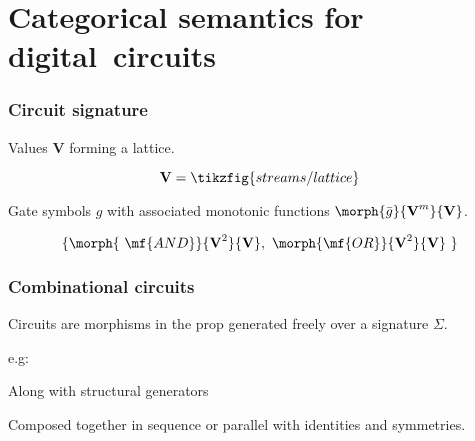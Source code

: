 \section{Categorical semantics for digital~circuits}

\begin{frame}
    \frametitle{Circuit signature}

    \pause

    \alert{Values} $\textbf{V}$ forming a lattice.

    \pause

    \[\textbf{V} = \tikzfig{streams/lattice}\]

    \pause

    \alert{Gate symbols} $g$ with associated monotonic functions $\morph{\bar{g}}{\textbf{V}^m}{\textbf{V}}$.

    \pause

    \[\{\morph{\ \mf{AND}}{\textbf{V}^2}{\textbf{V}},\ \morph{\mf{OR}}{\textbf{V}^2}{\textbf{V}}\ \}\]

\end{frame}

\begin{frame}
    \frametitle{Combinational circuits}

    \pause

    Circuits are morphisms in the prop generated freely over a signature $\Sigma$.

    \pause

    e.g:

    \begin{center}

        \pause

        \vspace{1em}

    \end{center}

    \vspace{1em}

    \pause

    Along with \alert{structural} generators 

    \begin{center}
        \quad
        \quad
    \end{center}

    \pause

    Composed together in sequence or parallel with identities and symmetries.

\end{frame}

